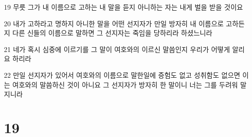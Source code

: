 \par 19 무릇 그가 내 이름으로 고하는 내 말을 듣지 아니하는 자는 내게 벌을 받을 것이요
\par 20 내가 고하라고 명하지 아니한 말을 어떤 선지자가 만일 방자히 내 이름으로 고하든지 다른 신들의 이름으로 말하면 그 선지자는 죽임을 당하리라 하셨느니라
\par 21 네가 혹시 심중에 이르기를 그 말이 여호와의 이르신 말씀인지 우리가 어떻게 알리요 하리라
\par 22 만일 선지자가 있어서 여호와의 이름으로 말한일에 증험도 없고 성취함도 없으면 이는 여호와의 말씀하신 것이 아니요 그 선지자가 방자히 한 말이니 너는 그를 두려워 말지니라

\chapter{19}

